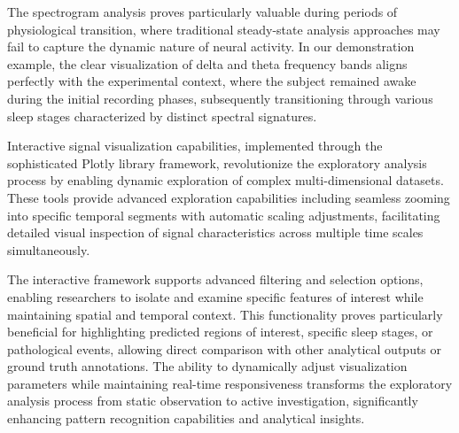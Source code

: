 \documentclass[a4paper,12pt,twoside]{article}
\begin{document}
The spectrogram analysis proves particularly valuable during periods of physiological transition, where traditional steady-state analysis approaches may fail to capture the dynamic nature of neural activity. In our demonstration example, the clear visualization of delta and theta frequency bands aligns perfectly with the experimental context, where the subject remained awake during the initial recording phases, subsequently transitioning through various sleep stages characterized by distinct spectral signatures.

Interactive signal visualization capabilities, implemented through the sophisticated Plotly library framework, revolutionize the exploratory analysis process by enabling dynamic exploration of complex multi-dimensional datasets. These tools provide advanced exploration capabilities including seamless zooming into specific temporal segments with automatic scaling adjustments, facilitating detailed visual inspection of signal characteristics across multiple time scales simultaneously.

The interactive framework supports advanced filtering and selection options, enabling researchers to isolate and examine specific features of interest while maintaining spatial and temporal context. This functionality proves particularly beneficial for highlighting predicted regions of interest, specific sleep stages, or pathological events, allowing direct comparison with other analytical outputs or ground truth annotations. The ability to dynamically adjust visualization parameters while maintaining real-time responsiveness transforms the exploratory analysis process from static observation to active investigation, significantly enhancing pattern recognition capabilities and analytical insights.
\end{document}
